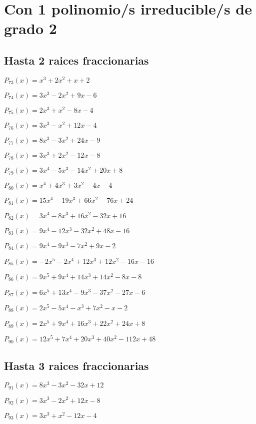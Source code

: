 \section{Con 1 polinomio/s irreducible/s de grado 2}
\subsection{Hasta 2 raices fraccionarias}

\subitem $P_{73}(x) = x^3 + 2x^2 + x + 2$

\subitem $P_{74}(x) = 3x^3 - 2x^2 + 9x - 6$

\subitem $P_{75}(x) = 2x^3 + x^2 - 8x - 4$

\subitem $P_{76}(x) = 3x^3 - x^2 + 12x - 4$

\subitem $P_{77}(x) = 8x^3 - 3x^2 + 24x - 9$

\subitem $P_{78}(x) = 3x^3 + 2x^2 - 12x - 8$


\subitem $P_{79}(x) = 3x^4 - 5x^3 - 14x^2 + 20x + 8$

\subitem $P_{80}(x) = x^4 + 4x^3 + 3x^2 - 4x - 4$

\subitem $P_{81}(x) = 15x^4 - 19x^3 + 66x^2 - 76x + 24$

\subitem $P_{82}(x) = 3x^4 - 8x^3 + 16x^2 - 32x + 16$

\subitem $P_{83}(x) = 9x^4 - 12x^3 - 32x^2 + 48x - 16$

\subitem $P_{84}(x) = 9x^4 - 9x^3 - 7x^2 + 9x - 2$


\subitem $P_{85}(x) = -2x^5 - 2x^4 + 12x^3 + 12x^2 - 16x - 16$

\subitem $P_{86}(x) = 9x^5 + 9x^4 + 14x^3 + 14x^2 - 8x - 8$

\subitem $P_{87}(x) = 6x^5 + 13x^4 - 9x^3 - 37x^2 - 27x - 6$

\subitem $P_{88}(x) = 2x^5 - 5x^4 - x^3 + 7x^2 - x - 2$

\subitem $P_{89}(x) = 2x^5 + 9x^4 + 16x^3 + 22x^2 + 24x + 8$

\subitem $P_{90}(x) = 12x^5 + 7x^4 + 20x^3 + 40x^2 - 112x + 48$

\subsection{Hasta 3 raices fraccionarias}

\subitem $P_{91}(x) = 8x^3 - 3x^2 - 32x + 12$

\subitem $P_{92}(x) = 3x^3 - 2x^2 + 12x - 8$

\subitem $P_{93}(x) = 3x^3 + x^2 - 12x - 4$

